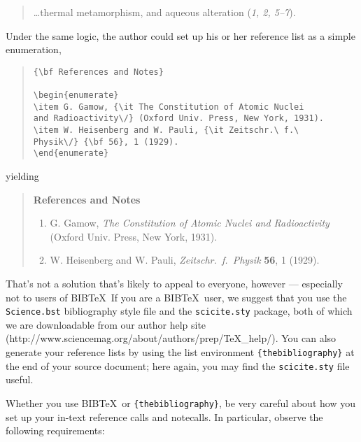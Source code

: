 \documentclass[12pt]{article}
\begin{document}
\begin{quote}
\ldots thermal metamorphism, and aqueous alteration ({\it 1, 2, 5--7\/}).
\end{quote}

Under the same logic, the author could set up his or her reference list as a simple enumeration,

\begin{quote}
\begin{verbatim}
{\bf References and Notes}

\begin{enumerate}
\item G. Gamow, {\it The Constitution of Atomic Nuclei
and Radioactivity\/} (Oxford Univ. Press, New York, 1931).
\item W. Heisenberg and W. Pauli, {\it Zeitschr.\ f.\ 
Physik\/} {\bf 56}, 1 (1929).
\end{enumerate}
\end{verbatim}
\end{quote}

\noindent yielding

\begin{quote}
{\bf References and Notes}

\begin{enumerate}
\item G. Gamow, {\it The Constitution of Atomic Nuclei and
Radioactivity\/} (Oxford Univ. Press, New York, 1931).
\item W. Heisenberg and W. Pauli, {\it Zeitschr.\ f.\ Physik} {\bf 56},
1 (1929).
\end{enumerate}
\end{quote}

That's not a solution that's likely to appeal to everyone, however ---
especially not to users of B{\small{IB}}\TeX\   If you
are a B{\small{IB}}\TeX\ user, we suggest that you use the
\texttt{Science.bst} bibliography style file and the
\texttt{scicite.sty} package, both of which we are downloadable from our author help site
(http://www.sciencemag.org/about/authors/prep/TeX\_help/).  You can also
generate your reference lists by using the list environment
\texttt{\{thebibliography\}} at the end of your source document; here
again, you may find the \texttt{scicite.sty} file useful.

Whether you use B{\small{IB}}\TeX\ or \texttt{\{thebibliography\}}, be
very careful about how you set up your in-text reference calls and
notecalls.  In particular, observe the following requirements:
\end{document}
